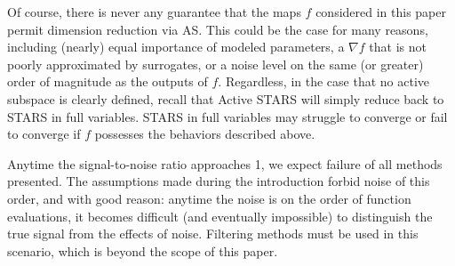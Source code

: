 \documentclass{amsart}
\begin{document}
Of course, there is never any guarantee that the maps $f$ considered in this paper permit dimension reduction via AS. This could be the case for many reasons, including (nearly) equal importance of modeled parameters, a $\nabla f$ that is not poorly approximated by surrogates, %
or a noise level on the same (or greater) order of magnitude as the outputs of $f$. Regardless, in the case that no active subspace is clearly defined, recall that Active STARS will simply reduce back to STARS in full variables. STARS in full variables may struggle to converge or fail to converge if $f$ possesses the behaviors described above.

Anytime the signal-to-noise ratio approaches 1, we expect failure of all methods presented. The assumptions made during the introduction forbid noise of this order, and with good reason: anytime the noise is on the order of function evaluations, it becomes difficult (and eventually impossible) to distinguish the true signal from the effects of noise. Filtering methods must be used in this scenario, which is beyond the scope of this paper. %
\end{document}
